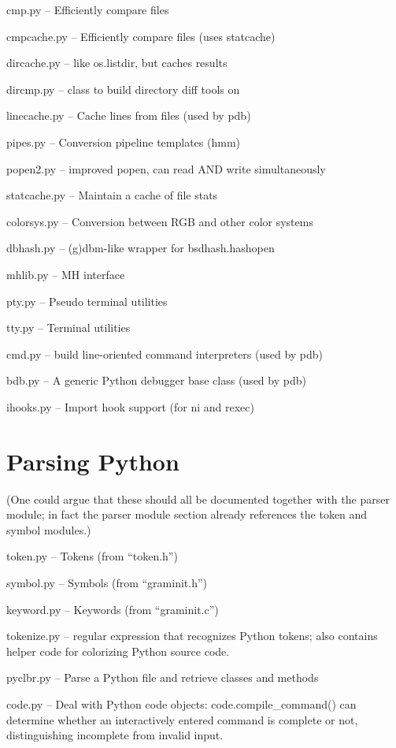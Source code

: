 cmp.py -- Efficiently compare files

cmpcache.py -- Efficiently compare files (uses statcache)

dircache.py -- like os.listdir, but caches results

dircmp.py -- class to build directory diff tools on

linecache.py -- Cache lines from files (used by pdb)

pipes.py -- Conversion pipeline templates (hmm)

popen2.py -- improved popen, can read AND write simultaneously

statcache.py -- Maintain a cache of file stats

colorsys.py -- Conversion between RGB and other color systems

dbhash.py -- (g)dbm-like wrapper for bsdhash.hashopen

mhlib.py -- MH interface

pty.py -- Pseudo terminal utilities

tty.py -- Terminal utilities

cmd.py -- build line-oriented command interpreters (used by pdb)

bdb.py -- A generic Python debugger base class (used by pdb)

ihooks.py -- Import hook support (for ni and rexec)


\section{Parsing Python}

(One could argue that these should all be documented together with the
parser module; in fact the parser module section already references
the token and symbol modules.)

token.py -- Tokens (from ``token.h'')

symbol.py -- Symbols (from ``graminit.h'')

keyword.py -- Keywords (from ``graminit.c'')

tokenize.py -- regular expression that recognizes Python tokens; also
contains helper code for colorizing Python source code.

pyclbr.py -- Parse a Python file and retrieve classes and methods

code.py -- Deal with Python code objects: code.compile_command() can
determine whether an interactively entered command is complete or not,
distinguishing incomplete from invalid input.


